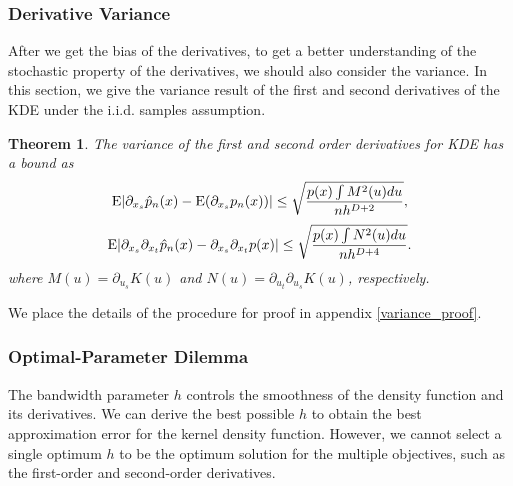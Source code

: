 \documentclass[aos,preprint]{imsart}
\newtheorem{theorem}{Theorem}[section]
\theoremstyle{remark}
\begin{document}
\subsubsection{Derivative Variance}
After we get the bias of the derivatives, to get a better understanding of the stochastic property of the derivatives, we should also consider the variance. In this section, we give the variance result of the first and second derivatives of the KDE under the i.i.d. samples assumption. 
\begin{theorem}
The variance of the first and second order derivatives for KDE has a bound as 
\begin{equation*}\label{VarResult}
{\rm E} |\partial_{x_s} \hat{p}_n(x)-{\rm E}(\partial_{x_s} p_n(x))| \leq \sqrt{\frac{p(x)\int M^2(u)du}{n h^{D+2}}},
\end{equation*}
\begin{equation*}\label{VarResult2}
{\rm E} | \partial_{x_s}\partial_{x_t} \hat{p}_n(x) -\partial_{x_s}\partial_{x_t} p(x)| \leq \sqrt{\frac{p(x)\int N^2(u)du}{nh^{D+4}}}.
\end{equation*}
where $M(u) = \partial_{u_s}K(u)$ and $N(u) = \partial_{u_t}\partial_{u_s}K(u)$, respectively.
\end{theorem}
We place the details of the procedure for proof in appendix \ref{variance_proof}.

\subsubsection{Optimal-Parameter Dilemma}
The bandwidth parameter $h$ controls the smoothness of the density function and its derivatives. We can derive the best possible $h$ to obtain the best approximation error for the kernel density function. However, we cannot select a single optimum $h$ to be the optimum solution for the multiple objectives, such as the first-order and second-order derivatives.
\end{document}
